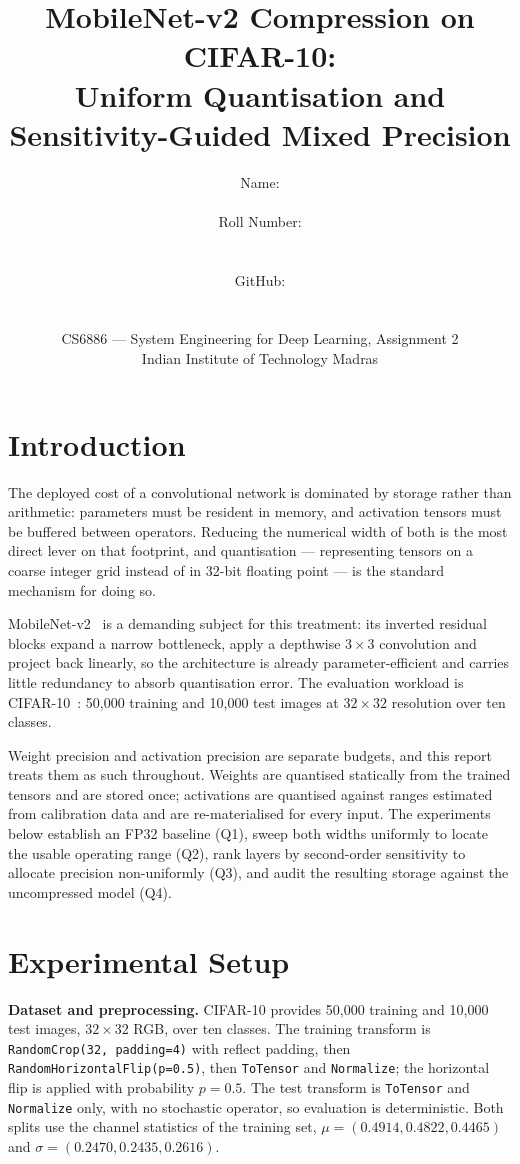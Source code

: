 \documentclass[10pt,a4paper]{article}
\title{\vspace{-1.0cm}\textbf{MobileNet-v2 Compression on CIFAR-10:\\
Uniform Quantisation and Sensitivity-Guided Mixed Precision}}
\author{%
Name: \rule{4cm}{0.4pt} \qquad Roll Number: \rule{3cm}{0.4pt}\\[3pt]
GitHub: \rule{7cm}{0.4pt}\\[5pt]
CS6886 --- System Engineering for Deep Learning, Assignment 2\\
Indian Institute of Technology Madras}
\date{}
\begin{document}
\maketitle
\vspace{-0.9cm}

\section{Introduction}
The deployed cost of a convolutional network is dominated by storage rather than
arithmetic: parameters must be resident in memory, and activation tensors must be
buffered between operators. Reducing the numerical width of both is the most
direct lever on that footprint, and quantisation --- representing tensors on a
coarse integer grid instead of in 32-bit floating point --- is the standard
mechanism for doing so.

MobileNet-v2~\cite{sandler2018mobilenetv2} is a demanding subject for this
treatment: its inverted residual blocks expand a narrow bottleneck, apply a
depthwise $3\times3$ convolution and project back linearly, so the architecture is
already parameter-efficient and carries little redundancy to absorb quantisation
error. The evaluation workload is
CIFAR-10~\cite{krizhevsky2009cifar}: 50{,}000 training and 10{,}000 test images at
$32\times32$ resolution over ten classes.

Weight precision and activation precision are separate budgets, and this report
treats them as such throughout. Weights are quantised statically from the trained
tensors and are stored once; activations are quantised against ranges estimated
from calibration data and are re-materialised for every input. The experiments
below establish an FP32 baseline (Q1), sweep both widths uniformly to locate the
usable operating range (Q2), rank layers by second-order sensitivity to allocate
precision non-uniformly (Q3), and audit the resulting storage against the
uncompressed model (Q4).

\section{Experimental Setup}
\textbf{Dataset and preprocessing.} CIFAR-10 provides 50{,}000 training and
10{,}000 test images, $32\times32$ RGB, over ten classes. The training transform is
\texttt{RandomCrop(32, padding=4)} with reflect padding, then
\texttt{RandomHorizontalFlip(p=0.5)}, then \texttt{ToTensor} and
\texttt{Normalize}; the horizontal flip is applied with probability $p=0.5$. The
test transform is \texttt{ToTensor} and \texttt{Normalize} only, with no
stochastic operator, so evaluation is deterministic. Both splits use the
channel statistics of the training set,
$\mu = (0.4914, 0.4822, 0.4465)$ and $\sigma = (0.2470, 0.2435, 0.2616)$.
\end{document}
